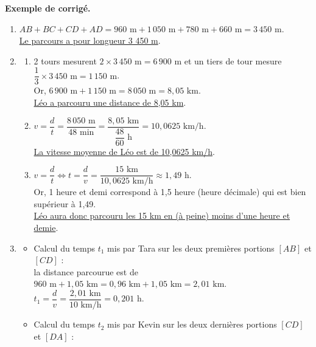 \begin{activite}
\begin{QCM}
   \end{QCM}
   
   \bigskip
   
   \textcolor{G1}{
   {\bf Exemple de corrigé.} \smallskip
      \begin{enumerate}
         \item $AB+BC+CD+AD =960\text{ m}+1\,050\text{ m}+780\text{ m}+660\text{ m} =3\,450\text{ m}$. \\
            \uline{Le parcours a pour longueur 3 450 m}.
         \item
            \begin{enumerate}
               \item 2 tours mesurent $2\times3\,450\text{ m} =6\,900\text{ m}$ et un tiers de tour mesure $\dfrac13\times3\,450\text{ m} =1\,150\text{ m}$. \\
                   Or, $6\,900\text{ m}+1\,150\text{ m} =8\,050\text{ m} =8,05\text{ km}$. \\
                  \uline{Léo a parcouru une distance de 8,05 km}. \smallskip
               \item $v=\dfrac{d}{t} =\dfrac{8\,050\text{ m}}{48\text{ min}} =\dfrac{8,05\text{ km}}{\dfrac{48}{60}\text{ h}} =10,0625\text{ km/h}.$ \\ [1mm]
                  \uline{La vitesse moyenne de Léo est de 10,0625 km/h}.
               \item $v=\dfrac{d}{t} \iff t =\dfrac{d}{v} =\dfrac{15\text{ km}}{10,0625\text{ km/h}} \approx 1,49\text{ h}.$ \\ [1mm]
                  Or, 1 heure et demi correspond à 1,5 heure (heure décimale) qui est bien supérieur à 1,49. \\
                  \uline{Léo aura donc parcouru les 15 km en (à peine) moins d'une heure et demie}.
            \end{enumerate}
         \item
            \begin{itemize}
               \item Calcul du temps $t_1$ mis par Tara sur les deux premières portions $[AB]$ et $[CD]$ : \\
                  la distance parcourue est de $960\text{ m}+1,05\text{ km} =0,96\text{ km}+1,05\text{ km} =2,01\text{ km}$. \\ [1mm]
                  $t_1 =\dfrac{d}{v} =\dfrac{2,01\text{ km}}{10\text{ km/h}} =0,201\text{ h}$. \smallskip
               \item Calcul du temps $t_2$ mis par Kevin sur les deux dernières portions $[CD]$ et $[DA]$ : \\

\end{itemize}
\end{enumerate}}
\end{activite}
